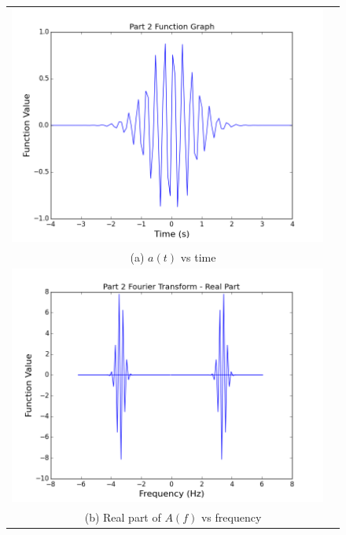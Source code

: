 \documentclass[11pt]{article}
\begin{document}
\begin{figure}[H]
\centering
\begin{tabular}{cc}
\includegraphics[scale=.4]{prt2_function.png} \\
\multicolumn{2}{c}{(a) $a(t)$ vs time} \\[6pt]

\includegraphics[scale=.4]{prt2_fourReal.png}\\
\multicolumn{2}{c}{(b) Real part of $A(f)$ vs frequency} \\[6pt]


\end{tabular}
\end{figure}
\end{document}
